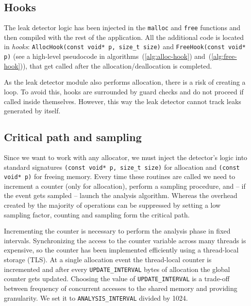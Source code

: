 \documentclass[preprint, numbers]{sigplanconf}
\begin{document}
\subsection{Hooks}

The leak detector logic has been injected in the \texttt{malloc} and \texttt{free} functions
and then compiled with the rest of the application.
All the additional code is located in \textit{hooks}: \texttt{AllocHook(const void*~p, size\_t size)}
and \texttt{FreeHook(const void* p)}
(see a high-level pseudocode in algorithms~(\ref{alg:alloc-hook}) and~(\ref{alg:free-hook})),
that get called after the allocation/deallocation is completed.

As the leak detector module also performs allocation, there is a risk
of creating a loop.
To avoid this, hooks are surrounded by guard checks and do not proceed
if called inside themselves.
However, this way the leak detector cannot track leaks generated by itself.

\subsection{Critical path and sampling}

Since we want to work with any allocator, we must inject the detector's logic into
standard signatures \texttt{(const void* p, size\_t size)} for allocation and
\texttt{(const void* p)} for freeing memory.
Every time these routines are called we need to increment a counter (only for allocation),
perform a sampling procedure, and -- if the event gets sampled -- launch the analysis algorithm.
Whereas the overhead created by the majority of operations can be suppressed by setting a low
sampling factor, counting and sampling form the critical path.

Incrementing the counter is necessary to perform the analysis phase in fixed intervals.
Synchronizing the access to the counter variable across many threads is expensive,
so the counter has been implemented efficiently using a thread-local storage (TLS).
At a single allocation event the thread-local counter is incremented and after every \texttt{UPDATE\_INTERVAL}
bytes of allocation the global counter gets updated.
Choosing the value of \texttt{UPDATE\_INTERVAL} is a trade-off between frequency of concurrent accesses
to the shared memory and providing granularity.
We set it to \texttt{ANALYSIS\_INTERVAL} divided by 1024.
\end{document}
